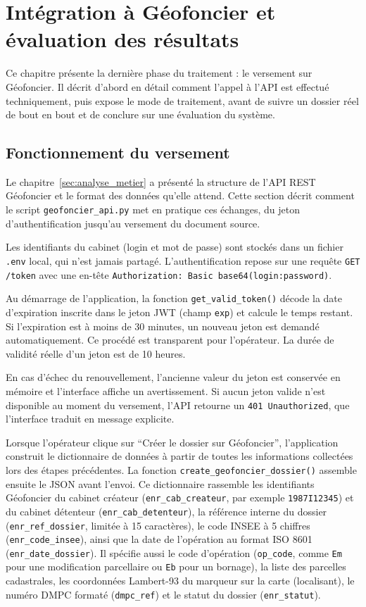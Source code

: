 
\section{Intégration à Géofoncier et évaluation des résultats}
\label{sec:integration}

Ce chapitre présente la dernière phase du traitement : le versement sur Géofoncier. Il décrit d'abord en détail comment l'appel à l'API est effectué techniquement, puis expose le mode de traitement, avant de suivre un dossier réel de bout en bout et de conclure sur une évaluation du système.

\subsection{Fonctionnement du versement}

Le chapitre~\ref{sec:analyse_metier} a présenté la structure de l'API REST Géofoncier et le format des données qu'elle attend. Cette section décrit comment le script \texttt{geofoncier\_api.py} met en pratique ces échanges, du jeton d'authentification jusqu'au versement du document source.

Les identifiants du cabinet (login et mot de passe) sont stockés dans un fichier \texttt{.env} local, qui n'est jamais partagé. L'authentification repose sur une requête \texttt{GET /token} avec une en-tête \texttt{Authorization: Basic base64(login:password)}.

Au démarrage de l'application, la fonction \texttt{get\_valid\_token()} décode la date d'expiration inscrite dans le jeton JWT (champ \texttt{exp}) et calcule le temps restant. Si l'expiration est à moins de 30 minutes, un nouveau jeton est demandé automatiquement. Ce procédé est transparent pour l'opérateur. La durée de validité réelle d'un jeton est de 10 heures.

En cas d'échec du renouvellement, l'ancienne valeur du jeton est conservée en mémoire et l'interface affiche un avertissement. Si aucun jeton valide n'est disponible au moment du versement, l'API retourne un \texttt{401 Unauthorized}, que l'interface traduit en message explicite.

Lorsque l'opérateur clique sur \enquote{Créer le dossier sur Géofoncier}, l'application construit le dictionnaire de données à partir de toutes les informations collectées lors des étapes précédentes. La fonction \texttt{create\_geofoncier\_dossier()} assemble ensuite le JSON avant l'envoi. Ce dictionnaire rassemble les identifiants Géofoncier du cabinet créateur (\texttt{enr\_cab\_createur}, par exemple \texttt{1987I12345}) et du cabinet détenteur (\texttt{enr\_cab\_detenteur}), la référence interne du dossier (\texttt{enr\_ref\_dossier}, limitée à 15 caractères), le code INSEE à 5 chiffres (\texttt{enr\_code\_insee}), ainsi que la date de l'opération au format ISO 8601 (\texttt{enr\_date\_dossier}). Il spécifie aussi le code d'opération (\texttt{op\_code}, comme \texttt{Em} pour une modification parcellaire ou \texttt{Eb} pour un bornage), la liste des parcelles cadastrales, les coordonnées Lambert-93 du marqueur sur la carte (localisant), le numéro DMPC formaté (\texttt{dmpc\_ref}) et le statut du dossier (\texttt{enr\_statut}).

